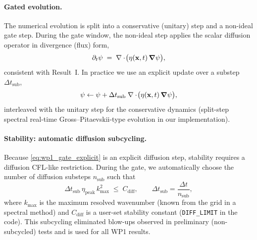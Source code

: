\documentclass[11pt]{article}
\theoremstyle{plain}
\theoremstyle{definition}
\theoremstyle{remark}
\newcommand{\diver}{\nabla\cdot}
\begin{document}
\paragraph{Gated evolution.}
The numerical evolution is split into a conservative (unitary) step and a non-ideal gate step. During
the gate window, the non-ideal step applies the scalar diffusion operator in divergence (flux) form,
\begin{equation}\label{eq:wp1_gate_step}
  \partial_t \psi \;=\; \diver\!\big(\eta(\mathbf{x},t)\,\grad\psi\big),
\end{equation}
consistent with Result~I. In practice we use an explicit update over a substep $\Delta t_{\text{sub}}$,
\begin{equation}\label{eq:wp1_gate_explicit}
  \psi \leftarrow \psi + \Delta t_{\text{sub}}\;\diver\!\big(\eta(\mathbf{x},t)\,\grad\psi\big),
\end{equation}
interleaved with the unitary step for the conservative dynamics (split-step spectral real-time
Gross--Pitaevskii-type evolution in our implementation).

\paragraph{Stability: automatic diffusion subcycling.}
Because \eqref{eq:wp1_gate_explicit} is an explicit diffusion step, stability requires a diffusion
CFL-like restriction. During the gate, we automatically choose the number of diffusion substeps
$n_{\text{sub}}$ such that
\begin{equation}\label{eq:wp1_diff_cfl}
  \Delta t_{\text{sub}}\,\eta_{\text{peak}}\,k_{\max}^2 \;\le\; C_{\text{diff}},
  \qquad
  \Delta t_{\text{sub}}=\frac{\Delta t}{n_{\text{sub}}},
\end{equation}
where $k_{\max}$ is the maximum resolved wavenumber (known from the grid in a spectral method) and
$C_{\text{diff}}$ is a user-set stability constant (\texttt{DIFF\_LIMIT} in the code). This subcycling
eliminated blow-ups observed in preliminary (non-subcycled) tests and is used for all WP1 results.
\end{document}
